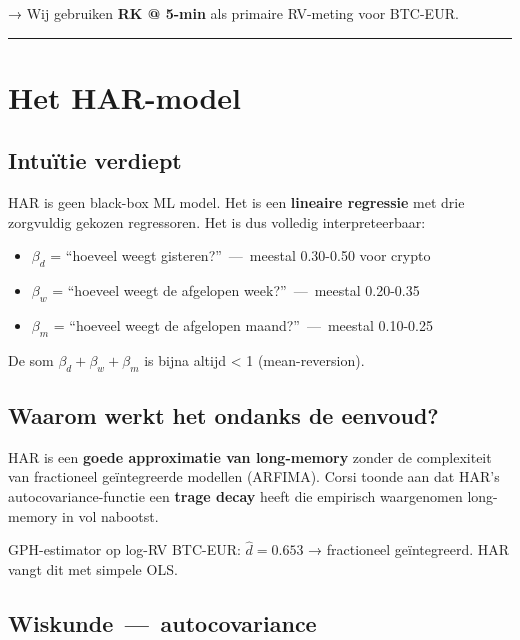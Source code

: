 \documentclass[11pt,a4paper]{article}
\begin{document}
→ Wij gebruiken \textbf{RK @ 5-min} als primaire RV-meting voor BTC-EUR.

\begin{center}\rule{0.5\linewidth}{0.5pt}\end{center}

\hypertarget{het-har-model}{%
\section{Het HAR-model}\label{het-har-model}}

\hypertarget{intuuxeftie-verdiept}{%
\subsection{Intuïtie verdiept}\label{intuuxeftie-verdiept}}

HAR is geen black-box ML model. Het is een \textbf{lineaire regressie} met drie zorgvuldig gekozen regressoren. Het is dus volledig interpreteerbaar:

\begin{itemize}
\tightlist
\item
  \(\beta_d\) = ``hoeveel weegt gisteren?'' \,---\, meestal 0.30-0.50 voor crypto
\item
  \(\beta_w\) = ``hoeveel weegt de afgelopen week?'' \,---\, meestal 0.20-0.35
\item
  \(\beta_m\) = ``hoeveel weegt de afgelopen maand?'' \,---\, meestal 0.10-0.25
\end{itemize}

De som \(\beta_d + \beta_w + \beta_m\) is bijna altijd \textless{} 1 (mean-reversion).

\hypertarget{waarom-werkt-het-ondanks-de-eenvoud}{%
\subsection{Waarom werkt het ondanks de eenvoud?}\label{waarom-werkt-het-ondanks-de-eenvoud}}

HAR is een \textbf{goede approximatie van long-memory} zonder de complexiteit van fractioneel geïntegreerde modellen (ARFIMA). Corsi toonde aan dat HAR's autocovariance-functie een \textbf{trage decay} heeft die empirisch waargenomen long-memory in vol nabootst.

GPH-estimator op log-RV BTC-EUR: \(\hat{d} = 0.653\) → fractioneel geïntegreerd. HAR vangt dit met simpele OLS.

\hypertarget{wiskunde-autocovariance}{%
\subsection{Wiskunde \,---\, autocovariance}\label{wiskunde-autocovariance}}
\end{document}
